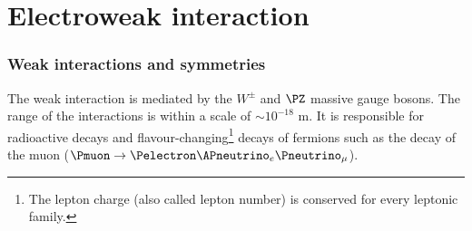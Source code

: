 \section{Electroweak interaction}
\label{sec:chap1:EW}

\subsubsection{Weak interactions and symmetries}
The weak interaction is mediated by the $W^{\pm}$ and $\PZ$ massive gauge bosons. 
The range of the interactions is within a scale of $\sim 10^{-18}$ m. %
It is responsible for radioactive decays and flavour-changing\footnote{The lepton charge (also called lepton number) is conserved for every leptonic family.} decays of fermions such as the decay of 
the muon ($\Pmuon \rightarrow \Pelectron \APneutrino_{e} \Pneutrino_{\mu}$).


